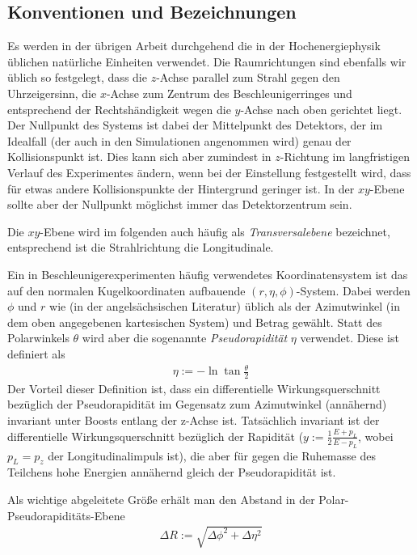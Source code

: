 \subsection{Konventionen und Bezeichnungen}
\label{cha:conv}
Es werden in der übrigen Arbeit durchgehend die in der Hochenergiephysik
üblichen natürliche Einheiten verwendet. Die Raumrichtungen sind ebenfalls wir
üblich so festgelegt, dass die $z$-Achse parallel zum Strahl gegen den
Uhrzeigersinn, die $x$-Achse zum Zentrum des Beschleunigerringes und entsprechend
der Rechtshändigkeit wegen die $y$-Achse nach oben gerichtet liegt. Der Nullpunkt
des Systems ist dabei der Mittelpunkt des Detektors, der im Idealfall (der auch
in den Simulationen angenommen wird) genau der Kollisionspunkt ist.  Dies kann
sich aber zumindest in $z$-Richtung im langfristigen Verlauf des Experimentes
ändern, wenn bei der Einstellung festgestellt wird, dass für etwas andere
Kollisionspunkte der Hintergrund geringer ist. In der $xy$-Ebene sollte aber der
Nullpunkt möglichst immer das Detektorzentrum sein.

Die $xy$-Ebene wird im folgenden auch häufig als \emph{Transversalebene}
bezeichnet, entsprechend ist die Strahlrichtung die Longitudinale.

Ein in Beschleunigerexperimenten häufig verwendetes Koordinatensystem ist das
auf den normalen Kugelkoordinaten aufbauende $(r, \eta, \phi)$-System.  Dabei
werden $\phi$ und $r$ wie (in der angelsächsischen Literatur) üblich als der
Azimutwinkel (in dem oben angegebenen kartesischen System) und Betrag gewählt.
Statt des Polarwinkels $\theta$ wird aber die sogenannte \emph{Pseudorapidität}
$\eta$ verwendet. Diese ist definiert als
\begin{align}
  \eta := -\ln{\tan{\frac \theta 2}}
\end{align}
Der Vorteil dieser Definition ist, dass ein differentielle Wirkungsquerschnitt
bezüglich der Pseudorapidität im Gegensatz zum Azimutwinkel (annähernd)
invariant unter Boosts entlang der z-Achse ist.  Tatsächlich invariant ist der
differentielle Wirkungsquerschnitt bezüglich der Rapidität ($y := \frac12
\frac{E + p_L}{E - p_L}$, wobei $p_L = p_z$ der Longitudinalimpuls ist), die
aber für gegen die Ruhemasse des Teilchens hohe Energien annähernd gleich der
Pseudorapidität ist.

Als wichtige abgeleitete Größe erhält man den Abstand in der
Polar-Pseudorapiditäts-Ebene
\begin{align}
  \Delta R := \sqrt{\Delta\phi^2 + \Delta\eta^2}
  \label{def:dr}
\end{align}
